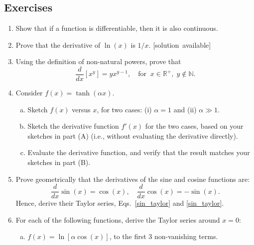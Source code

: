 \documentclass[10pt,a4paper]{article}
\begin{document}
\subsection{Exercises}\label{exercises}

\begin{enumerate}
\item
  Show that if a function is differentiable, then it is also
  continuous.

\item
  Prove that the derivative of $\ln(x)$ is $1/x$.
  \hfill{\scriptsize [solution~available]}

\item
  Using the definition of non-natural powers, prove that
  \begin{equation}
    \frac{d}{dx} [x^y] = y x^{y-1},
    \quad\mathrm{for}\;\;x \in \mathbb{R}^+, \; y \notin \mathbb{N}.
  \end{equation}

\item
  Consider $f(x) = \tanh(\alpha x)$.

  \begin{enumerate}[(a)]
  \item
    Sketch $f(x)$ versus $x$, for two cases: (i) $\alpha = 1$ and
    (ii) $\alpha \gg 1$.

  \item
    Sketch the derivative function $f'(x)$ for the two cases, based on
    your sketches in part (A) (i.e., without evaluating the derivative
    directly).

  \item
    Evaluate the derivative function, and verify that the result matches
    your sketches in part (B).
  \end{enumerate}

\item
  Prove geometrically that the derivatives of the sine and cosine
  functions are:
  \begin{equation}
    \frac{d}{dx}\sin(x) = \cos(x), \quad\frac{d}{dx}\cos(x) = -\sin(x).
  \end{equation}
  Hence, derive their Taylor series, Eqs.~\eqref{sin_taylor} and
  \eqref{sin_taylor}.

\item
  For each of the following functions, derive the Taylor series around
  $x = 0$:

  \begin{enumerate}[(a)]
  \item
    $f(x) = \ln\left[\alpha \cos(x)\right]$, to the first 3
    non-vanishing terms.


\end{enumerate}
\end{enumerate}
\end{document}
